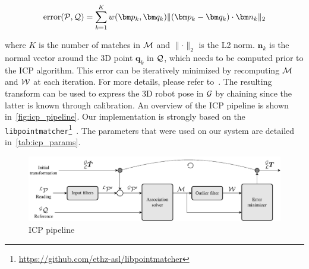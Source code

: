 \begin{equation}
	\text{error}(\readpc, \refpc) = \sum_{k=1}^{K} w(\bm p_k, \bm q_k) \lVert (\bm p_k - \bm q_k) \cdot \bm n_k \rVert_2
\end{equation}

where $K$ is the number of matches in $\mathcal{M}$ and $\lVert \cdot \rVert_2$ is the L2 norm.
$\bm n_k$ is the normal vector around the 3D point $\bm q_k$ in $\mathcal{Q}$, which needs to be computed prior to the \ac{ICP} algorithm.
This error can be iteratively minimized by recomputing $\mathcal{M}$ and $\mathcal{W}$ at each iteration.
For more details, please refer to~\citep{Pomerleau2015}.
The resulting transform \transform{\lidarf}{\mapf} can be used to express the 3D robot pose in $\mathcal{G}$ by chaining \transform{\lidarf}{\mapf} \transform{\robotf}{\lidarf} since the latter is known through calibration.
An overview of the \ac{ICP} pipeline is shown in~\autoref{fig:icp_pipeline}.
Our implementation is strongly based on the \texttt{libpointmatcher}\footnote{\url{https://github.com/ethz-asl/libpointmatcher}}~\citep{Pomerleau2013}.
The parameters that were used on our system are detailed in~\autoref{tab:icp_params}.


\begin{figure} [htpb]
	\centering
	\includegraphics[width=\linewidth]{figs/icp_pipeline/icp_pipeline.pdf}
	\caption{ICP pipeline}
	\label{fig:icp_pipeline}
\end{figure}


